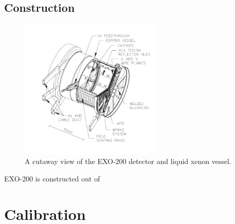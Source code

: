 \documentclass[herrin-thesis.tex]{subfiles}
\begin{document}
\subsection{Construction}

\begin{figure}
\centering
\includegraphics[width=0.6\textwidth]{./photos/detector_TPC.pdf}
\caption[Cutaway view of the EXO-200 detector]{A cutaway view of the EXO-200 detector and liquid xenon vessel.}
\label{fig:detector_TPC_vessel}
\end{figure}

EXO-200 is constructed out of

\section{Calibration}
\end{document}
